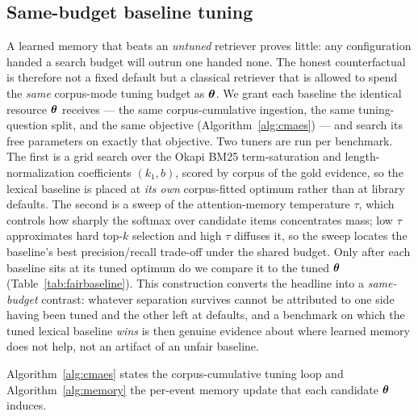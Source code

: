 \subsection{Same-budget baseline tuning}
\label{sec:budgettune}
A learned memory that beats an \emph{untuned} retriever proves little: any
configuration handed a search budget will outrun one handed none. The honest
counterfactual is therefore not a fixed default but a classical retriever that is
allowed to spend the \emph{same} corpus-mode tuning budget as $\boldsymbol{\theta}$. We
grant each baseline the identical resource $\boldsymbol{\theta}$ receives --- the same
corpus-cumulative ingestion, the same tuning-question split, and the same
\recallk{} objective (Algorithm~\ref{alg:cmaes}) --- and search its free
parameters on exactly that objective. Two tuners are run per benchmark. The first
is a grid search over the Okapi BM25 term-saturation and
length-normalization coefficients $(k_1, b)$, scored by corpus \recallk{} of the
gold evidence, so the lexical baseline is placed at \emph{its own} corpus-fitted
optimum rather than at library defaults. The second is a sweep of the
attention-memory temperature $\tau$, which controls how sharply the softmax over
candidate items concentrates mass; low $\tau$ approximates hard top-$k$ selection
and high $\tau$ diffuses it, so the sweep locates the baseline's best
precision/recall trade-off under the shared budget. Only after each baseline sits
at its tuned optimum do we compare it to the tuned $\boldsymbol{\theta}$
(Table~\ref{tab:fairbaseline}). This construction converts the headline into a
\emph{same-budget} contrast: whatever separation survives cannot be attributed to
one side having been tuned and the other left at defaults, and a benchmark on
which the tuned lexical baseline \emph{wins} is then genuine evidence about
where learned memory does not help, not an artifact of an unfair baseline.

Algorithm~\ref{alg:cmaes} states the corpus-cumulative tuning loop and
Algorithm~\ref{alg:memory} the per-event memory update that each candidate
$\boldsymbol{\theta}$ induces.

